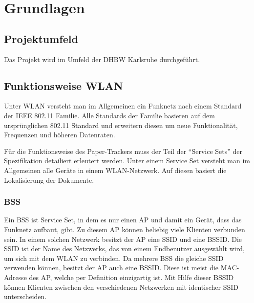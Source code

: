 \chapter{Grundlagen}

\section{Projektumfeld}

Das Projekt wird im Umfeld der \gls{DHBW} Karlsruhe durchgeführt.
\TODO{}

\section{Funktionsweise \gls{WLAN}}

Unter \gls{WLAN} versteht man im Allgemeinen ein Funknetz nach einem Standard der \gls{IEEE} 802.11 Familie.
Alle Standards der Familie basieren auf dem ursprünglichen 802.11 Standard und erweitern diesen um neue Funktionalität, Frequenzen und höheren Datenraten.


Für die Funktionsweise des Paper-Trackers muss der Teil der \enquote{Service Sets} der Spezifikation detailiert erleutert werden.
Unter einem Service Set versteht man im Allgemeinen alle Geräte in einem \gls{WLAN}-Netzwerk.
Auf diesen basiert die Lokalisierung der Dokumente.

\subsection{\gls{BSS}}

Ein \gls{BSS} ist Service Set, in dem es nur einen \gls{AP} und damit ein Gerät, dass das Funknetz aufbaut, gibt.
Zu diesem \gls{AP} können beliebig viele Klienten verbunden sein.
In einem solchen Netzwerk besitzt der \gls{AP} eine \gls{SSID} und eine \gls{BSSID}.
Die \gls{SSID} ist der Name des Netzwerks, das von einem Endbenutzer ausgewählt wird, um sich mit dem \gls{WLAN} zu verbinden.
Da mehrere \gls{BSS} die gleiche \gls{SSID} verwenden können, besitzt der \gls{AP} auch eine \gls{BSSID}.
Diese ist meist die \gls{MAC}-Adresse des \gls{AP}, welche per Definition einzigartig ist. 
Mit Hilfe dieser \gls{BSSID} können Klienten zwischen den verschiedenen Netzwerken mit identischer \gls{SSID} unterscheiden.

